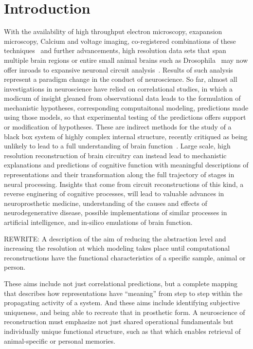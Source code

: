 \documentclass{ldr-article}
\begin{document}

\section{Introduction}

With the availability of high throughput electron microscopy, exapansion microscopy, Calcium and voltage imaging, co-registered combinations of these techniques~\cite{phelps2021,court2023} and further advancements, high resolution data sets that span multiple brain regions or entire small animal brains such as Drosophila~\cite{zheng2018} may now offer inroads to expansive neuronal circuit analysis~\cite{scheffer2020,buhmann2021}. Results of such analysis represent a paradigm change in the conduct of neuroscience. So far, almost all investigations in neuroscience have relied on correlational studies, in which a modicum of insight gleaned from observational data leads to the formulation of mechanistic hypotheses, corresponding computaitonal modeling, predictions made using those models, so that experimental testing of the predictions offers support or modification of hypotheses. These are indirect methods for the study of a black box system of highly complex internal structure, recently critiqued as being unlikely to lead to a full understanding of brain function~\cite{jonas2017}. Large scale, high resolution reconstruction of brain circuitry can instead lead to mechanistic explanations and predictions of cognitive function with meaningful descriptions of representations and their transformation along the full trajectory of stages in neural processing. Insights that come from circuit reconstructions of this kind, a reverse enginering of cognitive processes, will lead to valuable advances in neuroprosthetic medicine, understanding of the causes and effects of neurodegenerative disease, possible implementations of similar processes in artificial intelligence, and in-silico emulations of brain function.

\alert{REWRITE}: A description of the aim of reducing the abstraction level and increasing the resolution at which modeling takes place until computational reconstructions have the functional characteristics of a specific sample, animal or person.

These aims include not just correlational predictions, but a complete mapping that describes how representations have ``meaning'' from step to step within the propagating activity of a system. And these aims include identifying subjective uniqueness, and being able to recreate that in prosthetic form. A neuroscience of reconstruction must emphasize not just shared operational fundamentals but individually unique functional structure, such as that which enables retrieval of animal-specific or personal memories.
\end{document}
